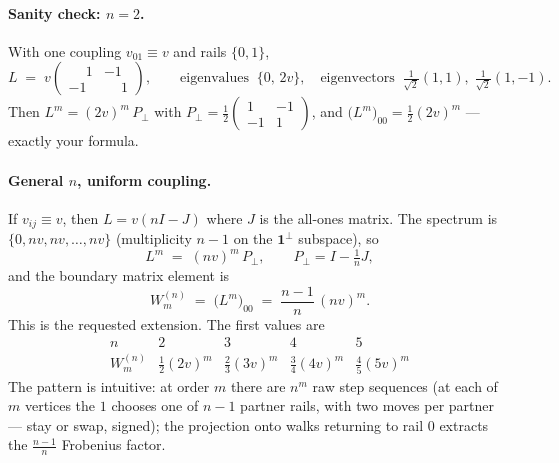 \documentclass[11pt,a4paper]{article}
\begin{document}
\paragraph{Sanity check: $n=2$.}
With one coupling $v_{01}\equiv v$ and rails $\{0,1\}$,
\[
L \;=\; v\begin{pmatrix} \phantom{-}1 & -1 \\ -1 & \phantom{-}1\end{pmatrix},
\qquad
\text{eigenvalues}\;\;\{0,\,2v\},\quad
\text{eigenvectors}\;\;\tfrac{1}{\sqrt 2}(1,1),\;\tfrac{1}{\sqrt2}(1,-1).
\]
Then $L^m = (2v)^m\,P_{\!\perp}$ with $P_{\!\perp}=\tfrac12\!\begin{pmatrix}1&-1\\-1&1\end{pmatrix}$,
and $\big(L^m\big)_{00}=\tfrac12(2v)^m$ --- exactly your formula. \,\checkmark

\paragraph{General $n$, uniform coupling.}
If $v_{ij}\equiv v$, then $L=v(nI-J)$ where $J$ is the all-ones matrix.
The spectrum is $\{0,nv,nv,\dots,nv\}$ (multiplicity $n-1$ on the
$\mathbf 1^{\perp}$ subspace), so
\[
L^{m} \;=\; (nv)^{m}\,P_{\!\perp},\qquad P_{\!\perp}=I-\tfrac{1}{n}J,
\]
and the boundary matrix element is
\begin{equation}\label{eq:closed}
\boxed{\;
W^{(n)}_m \;=\; \big(L^m\big)_{00}\;=\;\frac{n-1}{n}\,(nv)^m.\;}
\end{equation}
This is the requested extension. The first values are
\[
\renewcommand{\arraystretch}{1.15}
\begin{array}{c|c|c|c|c}
n & 2 & 3 & 4 & 5\\\hline
W^{(n)}_m & \tfrac12(2v)^m & \tfrac23(3v)^m & \tfrac34(4v)^m & \tfrac45(5v)^m
\end{array}
\]
The pattern is intuitive: at order $m$ there are $n^{m}$ raw step sequences
(at each of $m$ vertices the $1$ chooses one of $n-1$ partner rails, with two
moves per partner --- stay or swap, signed); the projection onto walks
returning to rail $0$ extracts the $\frac{n-1}{n}$ Frobenius factor.
\end{document}
